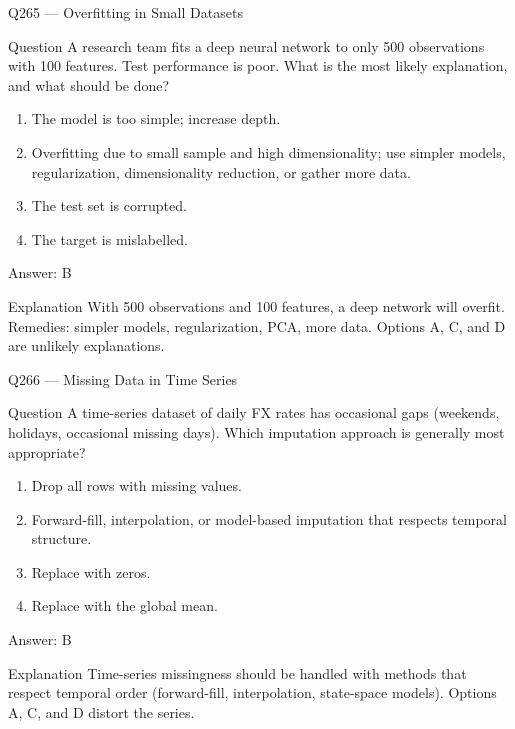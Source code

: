 \documentclass[aspectratio=169,8pt]{beamer}
\begin{document}
\begin{frame}{Q265 --- Overfitting in Small Datasets}
\begin{block}{Question}
A research team fits a deep neural network to only 500 observations with 100 features. Test performance is poor. What is the most likely explanation, and what should be done?
\end{block}
\begin{enumerate}
\item The model is too simple; increase depth.
\item Overfitting due to small sample and high dimensionality; use simpler models, regularization, dimensionality reduction, or gather more data.
\item The test set is corrupted.
\item The target is mislabelled.
\end{enumerate}
\begin{exampleblock}{Answer: B}\end{exampleblock}
\begin{block}{Explanation}
With 500 observations and 100 features, a deep network will overfit. Remedies: simpler models, regularization, PCA, more data. Options A, C, and D are unlikely explanations.
\end{block}
\end{frame}

\begin{frame}{Q266 --- Missing Data in Time Series}
\begin{block}{Question}
A time-series dataset of daily FX rates has occasional gaps (weekends, holidays, occasional missing days). Which imputation approach is generally most appropriate?
\begin{enumerate}
\item Drop all rows with missing values.
\item Forward-fill, interpolation, or model-based imputation that respects temporal structure.
\item Replace with zeros.
\item Replace with the global mean.
\end{enumerate} \end{block}
\begin{exampleblock}{Answer: B}\end{exampleblock}
\begin{block}{Explanation}
Time-series missingness should be handled with methods that respect temporal order (forward-fill, interpolation, state-space models). Options A, C, and D distort the series.
\end{block}
\end{frame}
\end{document}
